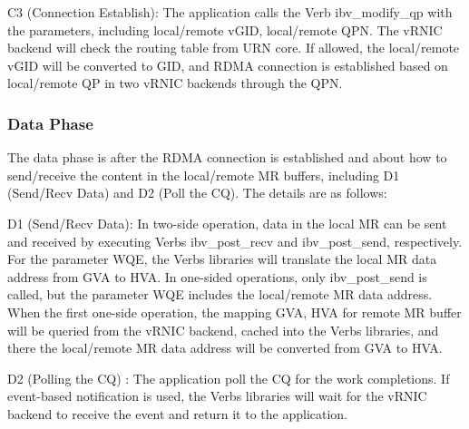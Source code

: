 C3 (Connection Establish): The application calls the Verb ibv\_modify\_qp with the parameters, including local/remote vGID, local/remote QPN. The vRNIC backend will check the routing table from URN core. If allowed, the local/remote vGID will be converted to GID, and RDMA connection is established based on local/remote QP in two vRNIC backends through the QPN. 

\subsubsection{Data Phase}
The data phase is after the RDMA connection is established and about how to send/receive the content in the local/remote MR buffers, including D1 (Send/Recv Data) and D2 (Poll the CQ). The details are as follows:

D1 (Send/Recv Data): In two-side operation, data in the local MR can be sent and received by executing Verbs ibv\_post\_recv and ibv\_post\_send, respectively. For the parameter WQE, the Verbs libraries will translate the local MR data address from GVA to HVA. In one-sided operations, only ibv\_post\_send is called, but the parameter WQE includes the local/remote MR data address. When the first one-side operation, the mapping {GVA, HVA} for remote MR buffer will be queried from the vRNIC backend, cached into the Verbs libraries, and there the local/remote MR data address will be converted from GVA to HVA.

D2 (Polling the CQ) : The application poll the CQ for the work completions. If event-based notification is used, the Verbs libraries will wait for the vRNIC backend to receive the event and return it to the application.

